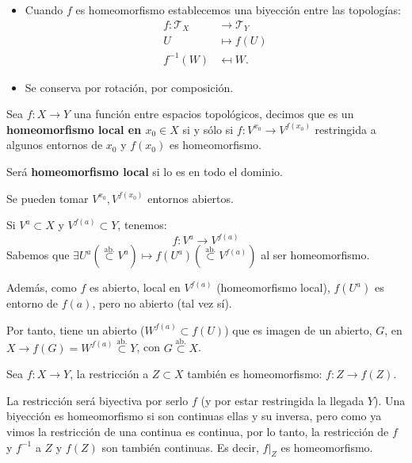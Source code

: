 \begin{obs}
\begin{itemize}
    \item Cuando $f$ es homeomorfismo establecemos una biyección entre las topologías:
    \begin{align*}
        f: \mathcal{T}_X &\rightarrow \mathcal{T}_Y\\
        U &\mapsto f\left( U \right)\\
        f^{-1}\left( W \right) &\mapsfrom W 
    .\end{align*}

    \item Se conserva por rotación, por composición.
\end{itemize}
\end{obs}

\begin{defi}
Sea $f: X \rightarrow Y$ una función entre espacios topológicos, decimos que es un \textbf{homeomorfismo local en $x_0 \in X$} si y sólo si $f: V^{x_0} \rightarrow V^{f\left( x_0 \right)}$ restringida a algunos entornos de $x_0$ y $f\left( x_0 \right)$ es homeomorfismo.

Será \textbf{homeomorfismo local} si lo es en todo el dominio.
\end{defi}

\begin{obs}
Se pueden tomar $V^{x_0}, V^{f\left( x_0 \right)}$ entornos abiertos.
\begin{demo}
Si $V^a \subset X$ y $V^{f\left( a \right)} \subset Y$, tenemos: 
\[
    f: V^a \rightarrow V^{f\left( a \right)}
\]
Sabemos que $\exists U^a (\stackrel{\text{ab.}}{\subset} V^a) \mapsto f\left( U^a \right) (\stackrel{\text{ab.}}{\subset} V^{f\left( a \right)})$ al ser homeomorfismo. 

Además, como $f$ es abierto, local en $V^{f\left( a \right)}$ (homeomorfismo local), $f\left( U^a \right)$ es entorno de $f\left( a \right)$, pero no abierto (tal vez sí). 

Por tanto, tiene un abierto ($W^{f\left( a \right)} \subset f\left( U \right)$) que es imagen de un abierto, $G$, en $X \rightarrow f\left( G \right) = W^{f\left( a \right)} \stackrel{\text{ab.}}{\subset} Y$, con $G \stackrel{\text{ab.}}{\subset} X$.
\end{demo}
\end{obs}

\begin{prop}
Sea $f: X \rightarrow Y$, la restricción a $Z \subset X$ también es homeomorfismo: $f: Z \rightarrow f\left( Z \right)$.
\end{prop}
\begin{demo}
La restricción será biyectiva por serlo $f$ (y por estar restringida la llegada $Y$). Una biyección es homeomorfismo si son continuas ellas y su inversa, pero como ya vimos la restricción de una continua es continua, por lo tanto, la restricción de $f$ y $f^{-1}$ a $Z$ y $f\left( Z \right)$ son también continuas. Es decir, $f|_Z$ es homeomorfismo.
\end{demo}

